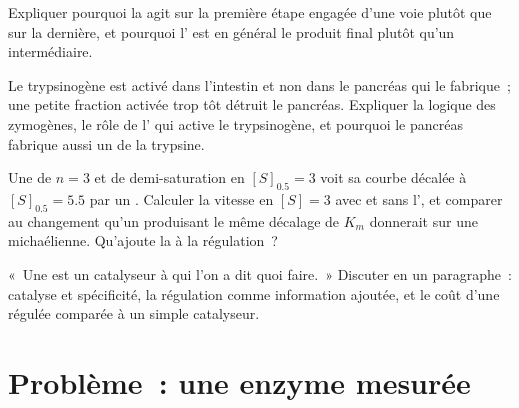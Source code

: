 \begin{exercise}[$\star\star$]\label{exo:b1:enzymes:9}
Expliquer pourquoi la  agit sur la première étape
engagée d'une voie plutôt que sur la dernière, et pourquoi
l' est en général le produit final plutôt qu'un
intermédiaire.
\end{exercise}

\begin{exercise}[$\star\star\star$]\label{exo:b1:enzymes:10}
Le trypsinogène est activé dans l'intestin et non dans le pancréas qui
le fabrique~; une petite fraction activée trop tôt détruit le pancréas.
Expliquer la logique des zymogènes, le rôle de l' qui active le
trypsinogène, et pourquoi le pancréas fabrique aussi un  de la
trypsine.
\end{exercise}

\begin{exercise}[$\star\star\star$]\label{exo:b1:enzymes:11}
Une  de $n = 3$ et de demi-saturation en $[S]_{0.5}
= 3$ voit sa courbe décalée à $[S]_{0.5} = 5.5$ par un .
Calculer la vitesse en $[S] = 3$ avec et sans l', et comparer
au changement qu'un   produisant le même décalage de
$K_m$ donnerait sur une  michaélienne. Qu'ajoute la 
à la régulation~?
\end{exercise}

\begin{exercise}[$\star\star\star$]\label{exo:b1:enzymes:12}
«~Une  est un catalyseur à qui l'on a dit quoi faire.~» Discuter
en un paragraphe~: catalyse et spécificité, la régulation comme
information ajoutée, et le coût d'une  régulée comparée à un
simple catalyseur.
\end{exercise}

\section{Problème~: une enzyme mesurée}

